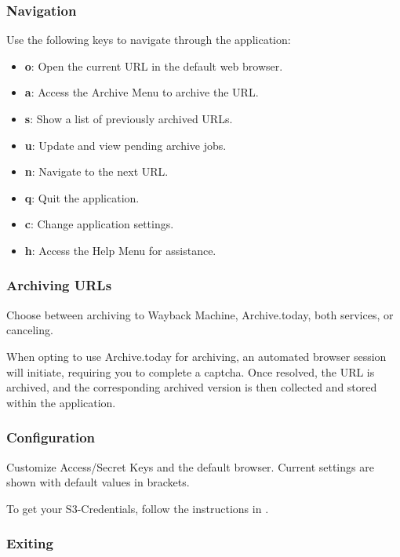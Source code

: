 \subsubsection{Navigation}

Use the following keys to navigate through the application:

\begin{itemize}
	\item \textbf{o}: Open the current URL in the default web browser.
	\item \textbf{a}: Access the Archive Menu to archive the URL.
	\item \textbf{s}: Show a list of previously archived URLs.
	\item \textbf{u}: Update and view pending archive jobs.
	\item \textbf{n}: Navigate to the next URL.
	\item \textbf{q}: Quit the application.
	\item \textbf{c}: Change application settings.
	\item \textbf{h}: Access the Help Menu for assistance.
\end{itemize}

\subsubsection{Archiving URLs}

Choose between archiving to Wayback Machine, Archive.today, both services, or canceling.

When opting to use Archive.today for archiving, an automated browser session will initiate, requiring you to complete a captcha. Once resolved, the URL is archived, and the corresponding archived version is then collected and stored within the application.

\subsubsection{Configuration}

Customize Access/Secret Keys and the default browser. Current settings are shown with default values in brackets. 

To get your S3-Credentials, follow the instructions in . 

\subsubsection{Exiting}

